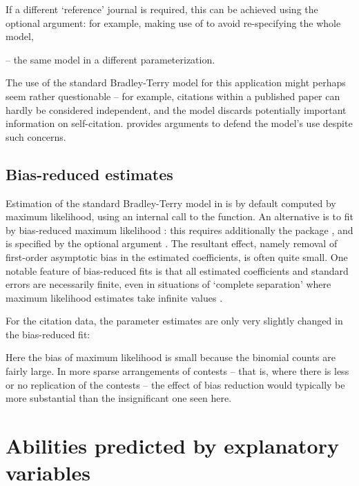 If a different `reference' journal is required, this can be achieved using the
optional  argument: for
example, making use of  to avoid re-specifying the whole model,

\Rcodeplaceholder{}

-- the same model in a different parameterization.

The use of the standard Bradley-Terry model for this application might perhaps
seem rather questionable -- for example, citations within a published paper can
hardly be considered independent, and the model discards potentially important
information on self-citation.  \citet{stig:94} provides arguments to defend the
model's use despite such concerns.

\subsection{Bias-reduced estimates}

Estimation of the standard Bradley-Terry model in  is by default
computed by maximum likelihood, using an internal call to the
 function.  An alternative  is to fit by bias-reduced
maximum likelihood \citep{firt:93}: this requires additionally the
package \citep{kosm:07}, and is specified by the optional argument .  The
resultant effect, namely removal of first-order asymptotic bias in
the estimated coefficients, is often quite small.  One notable feature of
bias-reduced fits is that all estimated coefficients and standard errors are
necessarily finite, even in situations of `complete separation' where maximum
likelihood estimates take
infinite values \citep{hein:sche:02}.

For the citation data, the parameter estimates are only very
slightly changed in the bias-reduced fit:

\Rcodeplaceholder{}

Here the bias of maximum likelihood is small because the binomial
counts are fairly large.  In more sparse arrangements of contests -- that is,
where there is less
or no replication of the contests -- the effect of bias reduction would
typically be more substantial than the insignificant one seen here.

\section{Abilities predicted by explanatory variables}
\label{sec:covariates}

